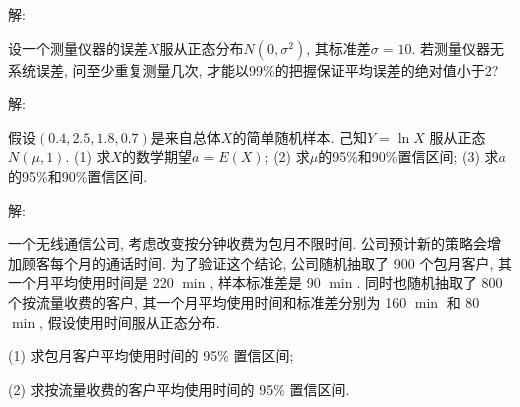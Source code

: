 \documentclass[standard]{ExBook}
\begin{document}
\begin{qitems}
\vspace{-5em}

    \begin{bbox}
解: 
    \end{bbox}

\vspace{-5em}

    \begin{bbox}
    \begin{shaded}
        \qitem
设一个测量仪器的误差$X$服从正态分布$N(0,\sigma^2)$, 其标准差$\sigma = 10$. 若测量仪器无系统误差, 问至少重复测量几次, 才能以99\%的把握保证平均误差的绝对值小于2?
    \end{shaded}
    \end{bbox}

\vspace{-5em}

    \begin{bbox}
解: 
    \end{bbox}

\vspace{-5em}

    \begin{bbox}
    \begin{shaded}
        \qitem
假设$(0.4,2.5,1.8,0.7)$是来自总体$X$的简单随机样本. 己知$Y = \ln X$ 服从正态$N(\mu,1)$.
(1) 求$X$的数学期望$a = E(X)$;
(2) 求$\mu$的95\%和90\%置信区间;
(3) 求$a$的95\%和90\%置信区间.
    \end{shaded}
    \end{bbox}

\vspace{-5em}

    \begin{bbox}
解: 
    \end{bbox}

\vspace{-5em}

    \begin{bbox}
    \begin{shaded}
        \qitem
一个无线通信公司, 考虑改变按分钟收费为包月不限时间. 公司预计新的策略会增加顾客每个月的通话时间. 为了验证这个结论, 公司随机抽取了 900 个包月客户, 其一个月平均使用时间是 220 $\min$, 样本标准差是 90 $\min$. 同时也随机抽取了 800 个按流量收费的客户, 其一个月平均使用时间和标准差分别为 160 $\min$ 和 80 $\min$, 假设使用时间服从正态分布.

(1) 求包月客户平均使用时间的 95\% 置信区间;

(2) 求按流量收费的客户平均使用时间的 95\% 置信区间.
    \end{shaded}
    \end{bbox}


\end{qitems}
\end{document}
